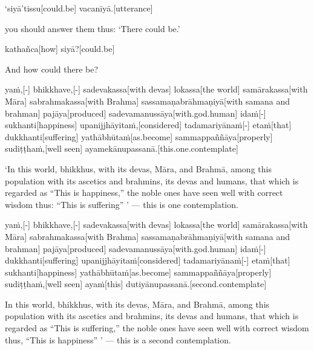 \begin{samepage}
\begingl[glneveryline={\PaliGlossA,\PaliGlossB}]
‘siyā’tissu[could.be] vacanīyā.[utterance]
\endgl
\nopagebreak
\linespread{0.5}
\begin{spacin}{0.2}
{\PaliGlossFT you should answer them thus: ‘There could be.’}
\end{spacin}
\vskip 12pt
\end{samepage}
\begin{samepage}
\begingl[glneveryline={\PaliGlossA,\PaliGlossB}]
kathañca[how] siyā?[could.be]
\endgl
\nopagebreak
\linespread{0.5}
\begin{spacin}{0.2}
{\PaliGlossFT And how could there be?}
\end{spacin}
\vskip 12pt
\end{samepage}
\begin{samepage}
\begingl[glneveryline={\PaliGlossA,\PaliGlossB}]
yaṁ,[-] bhikkhave,[-] sadevakassa[with devas] lokassa[the world] samārakassa[with Māra] sabrahmakassa[with Brahma] sassamaṇabrāhmaṇiyā[with samana and brahman] pajāya[produced] sadevamanussāya[with.god.human] idaṁ[-] sukhanti[happiness] upanijjhāyitaṁ,[considered] tadamariyānaṁ[-] etaṁ[that] dukkhanti[suffering] yathābhūtaṁ[as.become] sammappaññāya[properly] sudiṭṭhaṁ,[well seen] ayamekānupassanā.[this.one.contemplate]
\endgl
\nopagebreak
\linespread{0.5}
\begin{spacin}{0.2}
{\PaliGlossFT ‘In this world, bhikkhus, with its devas, Māra, and Brahmā, among this population with its ascetics and brahmins, its devas and humans, that which is regarded as “This is happiness,” the noble ones have seen well with correct wisdom thus: “This is suffering” ’ — this is one contemplation.}
\end{spacin}
\vskip 12pt
\end{samepage}
\begin{samepage}
\begingl[glneveryline={\PaliGlossA,\PaliGlossB}]
yaṁ,[-] bhikkhave,[-] sadevakassa[with devas] lokassa[the world] samārakassa[with Māra] sabrahmakassa[with Brahma] sassamaṇabrāhmaṇiyā[with samana and brahman] pajāya[produced] sadevamanussāya[with.god.human] idaṁ[-] dukkhanti[suffering] upanijjhāyitaṁ[considered] tadamariyānaṁ[-] etaṁ[that] sukhanti[happiness] yathābhūtaṁ[as.become] sammappaññāya[properly] sudiṭṭhaṁ,[well seen] ayaṁ[this] dutiyānupassanā.[second.contemplate]
\endgl
\nopagebreak
\linespread{0.5}
\begin{spacin}{0.2}
{\PaliGlossFT In this world, bhikkhus, with its devas, Māra, and Brahmā, among this population with its ascetics and brahmins, its devas and humans, that which is regarded as “This is suffering,” the noble ones have seen well with correct wisdom thus, “This is happiness” ’ — this is a second contemplation.}
\end{spacin}
\vskip 12pt
\end{samepage}
